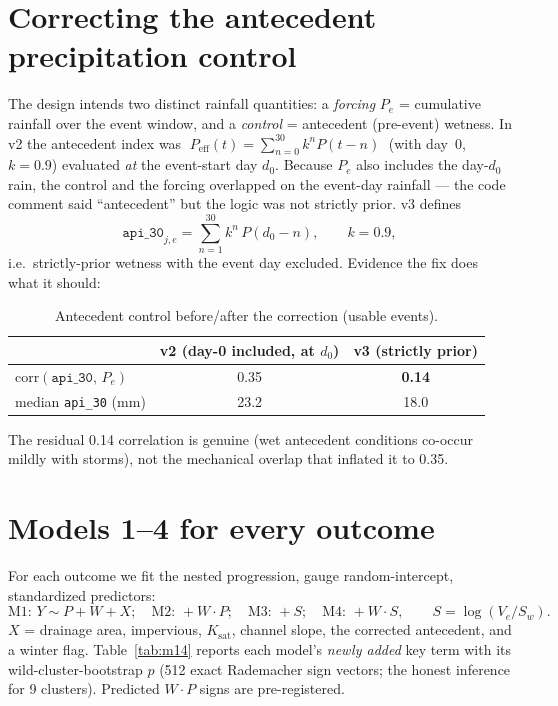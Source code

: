 \documentclass[11pt]{article}
\begin{document}
\section{Correcting the antecedent precipitation control}\label{sec:api}
The design intends two distinct rainfall quantities: a \emph{forcing} $P_e$ = cumulative rainfall
over the event window, and a \emph{control} = antecedent (pre-event) wetness. In v2 the antecedent
index was
$\;P_{\text{eff}}(t)=\sum_{n=0}^{30}k^{n}P(t-n)\;$ (with day~0, $k=0.9$) evaluated \emph{at} the
event-start day $d_0$. Because $P_e$ also includes the day-$d_0$ rain, the control and the forcing
overlapped on the event-day rainfall --- the code comment said ``antecedent'' but the logic was not
strictly prior. v3 defines
\begin{equation}
\texttt{api\_30}_{j,e}=\sum_{n=1}^{30}k^{n}\,P(d_0-n),\qquad k=0.9,
\end{equation}
i.e.\ strictly-prior wetness with the event day excluded. Evidence the fix does what it should:

\begin{table}[htbp]\centering
\caption{Antecedent control before/after the correction (usable events).}
\small
\begin{tabular}{lcc}
\toprule
 & v2 (day-0 included, at $d_0$) & v3 (strictly prior) \\
\midrule
$\mathrm{corr}(\texttt{api\_30},\,P_e)$ & 0.35 & \textbf{0.14} \\
median \texttt{api\_30} (mm) & 23.2 & 18.0 \\
\bottomrule
\end{tabular}
\end{table}

The residual 0.14 correlation is genuine (wet antecedent conditions co-occur mildly with storms),
not the mechanical overlap that inflated it to 0.35.

\section{Models 1--4 for every outcome}\label{sec:models}
For each outcome we fit the nested progression, gauge random-intercept, standardized predictors:
\[
\text{M1: }Y\sim P+W+X;\quad \text{M2: }+W\!\cdot\!P;\quad
\text{M3: }+S;\quad \text{M4: }+W\!\cdot\!S,\qquad S=\log(V_e/S_w).
\]
$X$ = drainage area, impervious, $K_{\text{sat}}$, channel slope, the corrected antecedent, and a
winter flag. Table~\ref{tab:m14} reports each model's \emph{newly added} key term with its
wild-cluster-bootstrap $p$ (512 exact Rademacher sign vectors; the honest inference for 9 clusters).
Predicted $W\!\cdot\!P$ signs are pre-registered.
\end{document}
